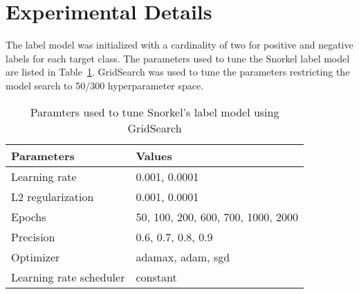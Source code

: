 \documentclass[10.7pt,]{article}
\begin{document}
\section{Experimental Details}\label{params}
%
The label model was initialized with a cardinality of two for positive and negative labels for each target class. 
The parameters used to tune the Snorkel label model are listed in Table~\ref{lm:params}.
GridSearch was used to tune the parameters restricting the model search to 50/300 hyperparameter space.
%
\begin{table}[ht]
\centering
\begin{tabular}{|l|l|}
\hline
Parameters               & Values                              \\
\hline
Learning rate           & 0.001, 0.0001                      \\
L2 regularization       & 0.001, 0.0001                      \\
Epochs                  & 50, 100, 200, 600, 700, 1000, 2000 \\
Precision               & 0.6, 0.7, 0.8, 0.9                 \\
Optimizer               & adamax, adam, sgd                  \\
Learning rate scheduler & constant                           \\
\hline
\end{tabular}
\caption{\label{lm:params} Paramters used to tune Snorkel's label model using GridSearch}
\end{table}
% 
\end{document}
